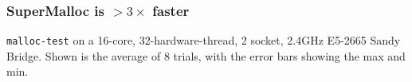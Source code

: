 \documentclass[xcolor=dvipsnames,14pt]{beamer}
\begin{document}
\begin{frame}
\frametitle{SuperMalloc is $>3\times$ faster}

{\small

}

\texttt{malloc-test} on a 16-core, 32-hardware-thread, 2 socket,
2.4GHz E5-2665 Sandy Bridge.  Shown is the average of 8 trials, with
the error bars showing the max and min.
\end{frame}
\end{document}
